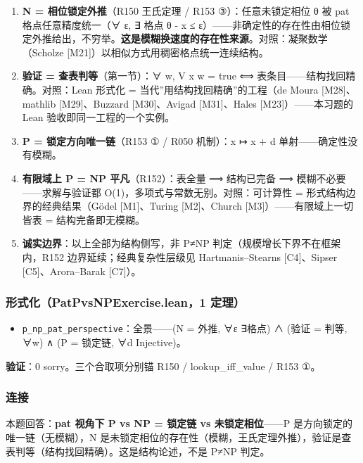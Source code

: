 \documentclass[
]{article}
\providecommand{\tightlist}{%
 \setlength{\itemsep}{0pt}\setlength{\parskip}{0pt}}
\begin{document}
\begin{enumerate}
\def\labelenumi{\arabic{enumi}.}
\tightlist
\item
 \textbf{N = 相位锁定外推}（R150 王氏定理 / R153 ③）：任意未锁定相位 θ
 被 pat 格点任意精度统一（∀ ε, ∃ 格点 \textbar θ - x\textbar{} ≤
 ε）------非确定性的存在性由相位锁定外推给出，不穷举。\textbf{这是模糊换速度的存在性来源}。对照：凝聚数学（Scholze
 {[}M21{]}）以相似方式用稠密格点统一连续结构。
\item
 \textbf{验证 = 查表判等}（第一节）：∀ w, V x w = true ⟺
 表条目------结构找回精确。对照：Lean 形式化 =
 当代''用结构找回精确''的工程（de Moura {[}M28{]}、mathlib
 {[}M29{]}、Buzzard {[}M30{]}、Avigad {[}M31{]}、Hales
 {[}M23{]}）------本习题的 Lean 验收即同一工程的一个实例。
\item
 \textbf{P = 锁定方向唯一链}（R153 ① / R050 机制）：x ↦ x + d
 单射------确定性没有模糊。
\item
 \textbf{有限域上 P = NP 平凡}（R152）：表全量 ⟹ 结构已完备 ⟹
 模糊不必要------求解与验证都 O(1)，多项式与常数无别。对照：可计算性 =
 形式结构边界的经典结果（Gödel {[}M1{]}、Turing {[}M2{]}、Church
 {[}M3{]}）------有限域上一切皆表 = 结构完备即无模糊。
\item
 \textbf{诚实边界}：以上全部为结构侧写，非 P≠NP
 判定（规模增长下界不在框架内，R152 边界延续；经典复杂性层级见
 Hartmanis--Stearns {[}C4{]}、Sipser {[}C5{]}、Arora--Barak
 {[}C7{]}）。
\end{enumerate}

\subsubsection{形式化（PatPvsNPExercise.lean，1
定理）}\label{ux5f62ux5f0fux5316patpvsnpexercise.lean1-ux5b9aux7406-3}

\begin{itemize}
\tightlist
\item
 \texttt{p\_np\_pat\_perspective}：全景------(N = 外推, ∀ε ∃格点) ∧
 (验证 = 判等, ∀w) ∧ (P = 锁定链, ∀d Injective)。
\end{itemize}

\textbf{验证}：0 sorry。三个合取项分别锚 R150 / lookup\_iff\_value /
R153 ①。

\subsubsection{连接}\label{ux8fdeux63a5-3}

本题回答：\textbf{pat 视角下 P vs NP = 锁定链 vs 未锁定相位}------P
是方向锁定的唯一链（无模糊），N
是未锁定相位的存在性（模糊，王氏定理外推），验证是查表判等（结构找回精确）。这是结构论述，不是
P≠NP 判定。
\end{document}
